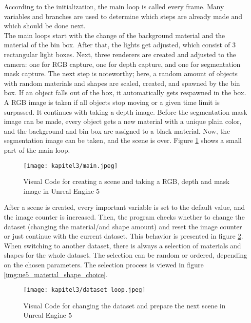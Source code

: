 		According to the initialization, the main loop is called every frame. Many variables and branches are used to determine which steps are already made and which should be done next.\\
		The main loops start with the change of the background material and the material of the bin box. After that, the lights get adjusted, which consist of 3 rectangular light boxes. Next, three renderers are created and adjusted to the camera: one for RGB capture, one for depth capture, and one for segmentation mask capture. The next step is noteworthy; here, a random amount of objects with random materials and shapes are scaled, created, and spawned by the bin box. If an object falls out of the box, it automatically gets respawned in the box. A RGB image is taken if all objects stop moving or a given time limit is surpassed. It continues with taking a depth image. Before the segmentation mask image can be made, every object gets a new material with a unique plain color, and the background and bin box are assigned to a black material. Now, the segmentation image can be taken, and the scene is over. Figure \ref{img:ue5_main} shows a small part of the main loop.
		
		\begin{figure}[h]
			\centering
			\texttt{[image: kapitel3/main.jpeg]}
			\caption[Visual Code for creating a scene and taking a RGB, depth and mask image in Unreal Engine 5 by Tobia Ippolito]{Visual Code for creating a scene and taking a RGB, depth and mask image in Unreal Engine 5}
			\label{img:ue5_main}
		\end{figure}
		
		After a scene is created, every important variable is set to the default value, and the image counter is increased. Then, the program checks whether to change the dataset (changing the material/and shape amount) and reset the image counter or just continue with the current dataset. This behavior is presented in figure \ref{img:ue5_dataset_loop}.\\
		When switching to another dataset, there is always a selection of materials and shapes for the whole dataset. The selection can be random or ordered, depending on the chosen parameters. The selection process is viewed in figure \ref{img:ue5_material_shape_choice}.
		
		\begin{figure}[h]
			\centering
			\texttt{[image: kapitel3/dataset\_loop.jpeg]}
			\caption[Visual Code for changing the dataset and prepare the next scene in Unreal Engine 5 by Tobia Ippolito]{Visual Code for changing the dataset and prepare the next scene in Unreal Engine 5}
			\label{img:ue5_dataset_loop}
		\end{figure}
		
